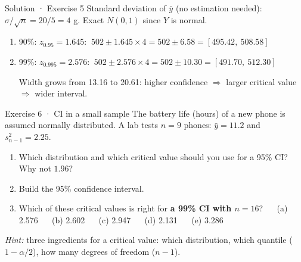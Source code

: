 \documentclass[
  11pt,
  ignorenonframetext,
  aspectratio=169,
]{beamer}
\providecommand{\tightlist}{%
  \setlength{\itemsep}{0pt}\setlength{\parskip}{0pt}}
\begin{document}
\begin{frame}{Solution · Exercise 5}
\protect{}\label{solution-exercise-5}
Standard deviation of \(\bar y\) (no estimation needed):
\(\sigma/\sqrt n=20/5=4\) g. Exact \(N(0,1)\) since \(Y\) is normal.

\begin{enumerate}
\item
  90\%: \(z_{0.95}=1.645\):
  \(\ 502\pm1.645\times4=502\pm6.58=\mathbf{[495.42,\ 508.58]}\)
\item
  99\%: \(z_{0.995}=2.576\):
  \(\ 502\pm2.576\times4=502\pm10.30=\mathbf{[491.70,\ 512.30]}\)

  Width grows from 13.16 to 20.61: higher confidence \(\Rightarrow\)
  larger critical value \(\Rightarrow\) wider interval.
\end{enumerate}
\end{frame}

\begin{frame}{Exercise 6 · CI in a small sample}
\protect{}\label{exercise-6-ci-in-a-small-sample}
The battery life (hours) of a new phone is assumed normally distributed.
A lab tests \(n=9\) phones: \(\bar y=11.2\) and \(s^2_{n-1}=2.25\).

\begin{enumerate}
\tightlist
\item
  Which distribution and which critical value should you use for a 95\%
  CI? Why not \(1.96\)?
\item
  Build the 95\% confidence interval.
\item
  Which of these critical values is right for \textbf{a 99\% CI with
  \(n=16\)}? \(\quad\) (a) 2.576 \(\quad\) (b) 2.602 \(\quad\) (c) 2.947
  \(\quad\) (d) 2.131 \(\quad\) (e) 3.286
\end{enumerate}

\emph{Hint:} three ingredients for a critical value: which distribution,
which quantile (\(1-\alpha/2\)), how many degrees of freedom (\(n-1\)).
\end{frame}
\end{document}
